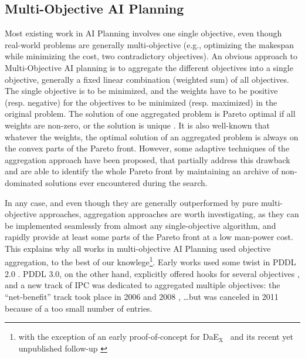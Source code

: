 \documentclass{llncs}
\def\DAEX{{\sc DaE$_{\text{X}}$}}
\begin{document}

\subsection{Multi-Objective AI Planning}
\label{sec:multiobjectivePlanning}
Most existing work in AI Planning involves one single objective, even though real-world problems are generally multi-objective (e.g., optimizing the makespan while minimizing the cost, two contradictory objectives). 
An obvious approach to Multi-Objective AI planning is to aggregate the different objectives into a single objective, generally a fixed linear combination (weighted sum) of all objectives. The single objective is to be minimized, and the weights have to be positive (resp. negative) for the objectives to be minimized (resp. maximized) in the original problem. 
The solution of one aggregated problem is Pareto optimal if all weights are non-zero, or the solution is unique \cite{miettinen1999nonlinear}. It is also well-known that whatever the weights, the optimal solution of an aggregated problem is always on the convex parts of the Pareto front. 
However, some adaptive techniques of the aggregation approach have been proposed, that partially address this drawback \cite{adaptingWeightsEMO01} and are able to identify the whole Pareto front by maintaining an archive of non-dominated solutions ever encountered during the search. 

In any case, and even though they are generally outperformed by pure multi-objective approaches, aggregation approaches are worth investigating, as they can be implemented seamlessly from almost any single-objective algorithm, and rapidly provide at least some parts of the Pareto front at a low man-power cost. 
This explains why all works in multi-objective AI Planning used objective aggregation, to the best of our knowlege\footnote{with the exception of an early proof-of-concept for \DAEX\ \cite{Schoenauer2006} and its recent yet unpublished follow-up \cite{emo2013}}. Early works used some twist in PDDL 2.0 \cite{do2003sapa,refanidis2003multiobjective,gerevini2008}. PDDL 3.0, on the other hand, explicitly offered hooks for several objectives \cite{gerevini2006preferences}, and a new track of IPC was dedicated to aggregated multiple objectives: the ``net-benefit'' track took place in 2006 \cite{chen2006temporal} and 2008 \cite{edelkamp2009optimal}, \ldots but was canceled in 2011 because of a too small number of entries.
\end{document}
